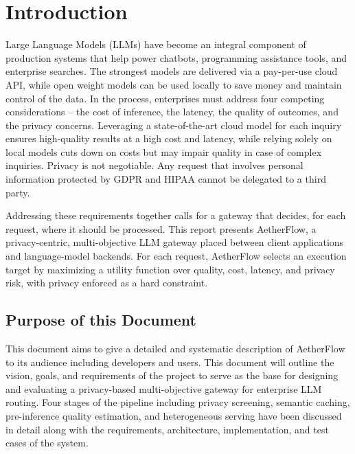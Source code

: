 \chapter{Introduction}
\label{ch:introduction}

Large Language Models (LLMs) have become an integral component of production systems that help power chatbots, programming assistance tools, and enterprise searches. The strongest models are delivered via a pay-per-use cloud API, while open weight models can be used locally to save money and maintain control of the data. In the process, enterprises must address four competing considerations – the cost of inference, the latency, the quality of outcomes, and the privacy concerns. Leveraging a state-of-the-art cloud model for each inquiry ensures high-quality results at a high cost and latency, while relying solely on local models cuts down on costs but may impair quality in case of complex inquiries. Privacy is not negotiable. Any request that involves personal information protected by GDPR and HIPAA cannot be delegated to a third party.

Addressing these requirements together calls for a gateway that decides, for each request, where it should be processed. This report presents AetherFlow, a privacy-centric, multi-objective LLM gateway placed between client applications and language-model backends. For each request, AetherFlow selects an execution target by maximizing a utility function over quality, cost, latency, and privacy risk, with privacy enforced as a hard constraint.
\section{Purpose of this Document}
\label{sec:purpose}

This document aims to give a detailed and systematic description of AetherFlow to its audience including developers and users. This document will outline the vision, goals, and requirements of the project to serve as the base for designing and evaluating a privacy-based multi-objective gateway for enterprise LLM routing. Four stages of the pipeline including privacy screening, semantic caching, pre-inference quality estimation, and heterogeneous serving have been discussed in detail along with the requirements, architecture, implementation, and test cases of the system.

